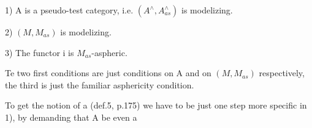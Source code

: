 1) A is a pseudo-test category, i.e. $(A^{\wedge},A^{\wedge}_{as})$ is modelizing.

2) $(M,M_{as})$ is modelizing.

3) The functor i is $M_{as}$-aspheric.

Te two first conditions are just conditions on A and on $(M,M_{as})$
respectively, the third is just the familiar asphericity condition.

To get the notion of a \hand{\uline{\textcolor{black}{weak}}} \hand{\uline{\textcolor{black}{test-functor}}} (def.5, p.175) we have to
be just one step more specific in 1), by demanding that A be even a

